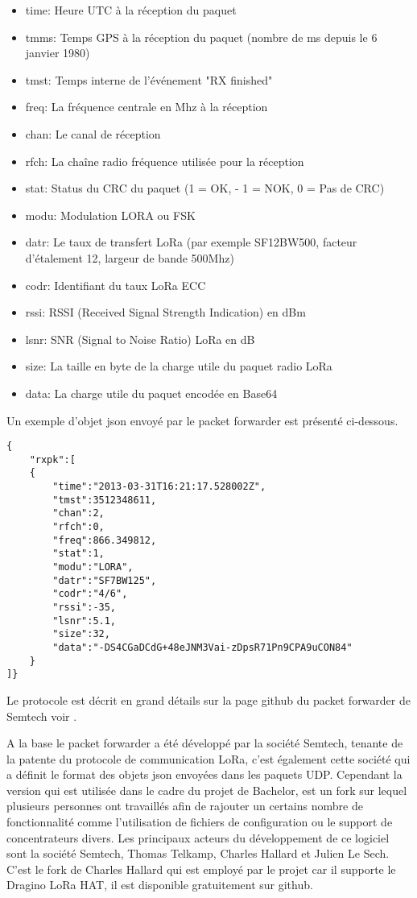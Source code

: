 \begin{itemize}
\item time: Heure UTC à la réception du paquet
\item tmms: Temps GPS à la réception du paquet (nombre de ms depuis le 6 janvier 1980)
\item tmst: Temps interne de l'événement "RX finished"
\item freq: La fréquence centrale en Mhz à la réception
\item chan: Le canal de réception
\item rfch: La chaîne radio fréquence utilisée pour la réception
\item stat: Status du CRC du paquet (1 = OK, - 1 = NOK, 0 = Pas de CRC)
\item modu: Modulation LORA ou FSK
\item datr: Le taux de transfert LoRa (par exemple SF12BW500, facteur d'étalement 12, largeur de bande 500Mhz)
\item codr: Identifiant du taux LoRa ECC
\item rssi: RSSI (Received Signal Strength Indication) en dBm
\item lsnr: SNR (Signal to Noise Ratio) LoRa en dB
\item size: La taille en byte de la charge utile du paquet radio LoRa
\item data: La charge utile du paquet encodée en Base64
\end{itemize}

Un exemple d'objet json envoyé par le packet forwarder est présenté ci-dessous.


\begin{lstlisting}
{
	"rxpk":[
	{
		"time":"2013-03-31T16:21:17.528002Z",
		"tmst":3512348611,
		"chan":2,
		"rfch":0,
		"freq":866.349812,
		"stat":1,
		"modu":"LORA",
		"datr":"SF7BW125",
		"codr":"4/6",
		"rssi":-35,
		"lsnr":5.1,
		"size":32,
		"data":"-DS4CGaDCdG+48eJNM3Vai-zDpsR71Pn9CPA9uCON84"
	}
]}
\end{lstlisting}

Le protocole est décrit en grand détails sur la page github du packet forwarder de Semtech voir \cite{lora-pkt-forwarder-protocol}.

A la base le packet forwarder a été développé par la société Semtech, tenante de la patente du protocole de communication LoRa, c'est également cette société qui a définit le format des objets json envoyées dans les paquets UDP. Cependant la version qui est utilisée dans le cadre du projet de Bachelor, est un fork sur lequel plusieurs personnes ont travaillés afin de rajouter un certains nombre de fonctionnalité comme l'utilisation de fichiers de configuration ou le support de concentrateurs divers. Les principaux acteurs du développement de ce logiciel sont la société Semtech, Thomas Telkamp, Charles Hallard et Julien Le Sech. C'est le fork de Charles Hallard qui est employé par le projet car il supporte le Dragino LoRa HAT, il est disponible gratuitement sur github. \cite{pkt-forwarder-hallard}

